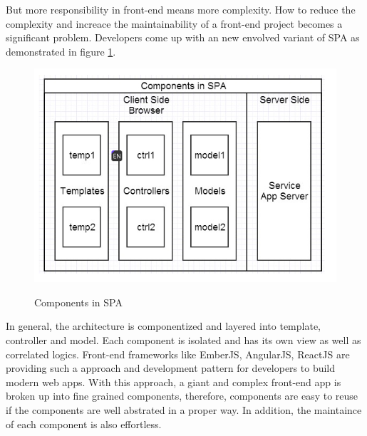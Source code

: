 But more responsibility in front-end means more complexity. How to reduce the complexity and increace the maintainability of a front-end project becomes a significant problem. Developers come up with an new envolved variant of SPA as demonstrated in figure \ref{fig:3.4}.

\begin{figure}[!htbp]
  \caption{Components in SPA}
  \centering
    \includegraphics[width=1\textwidth]{Figures/3_4.png}
  \label{fig:3.4}
\end{figure}

In general, the architecture is componentized and layered into template, controller and model. Each component is isolated and has its own view as well as correlated logics. Front-end frameworks like EmberJS, AngularJS, ReactJS are providing such a approach and development pattern for developers to build modern web apps. With this approach, a giant and complex front-end app is broken up into fine grained components, therefore, components are easy to reuse if the components are well abstrated in a proper way. In addition, the maintaince of each component is also effortless.


